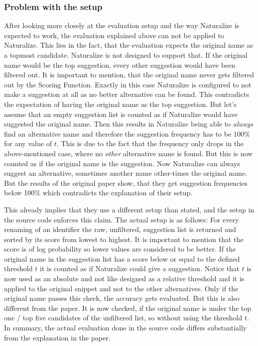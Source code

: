 \subsubsection{Problem with the setup}
After looking more closely at the evaluation setup and the way Naturalize is expected to work, the evaluation explained above can not be applied to Naturalize.
This lies in the fact, that the evaluation expects the original name as a topmost candidate. Naturalize is not designed to support that. If the original name would be the top suggestion, every other suggestion would have been filtered out. It is important to mention, that the original name never gets filtered out by the Scoring Function. Exactly in this case Naturalize is configured to not make a suggestion at all as no better alternative can be found. This contradicts the expectation of having the original name as the top suggestion. But let's assume that an empty suggestion list is counted as if Naturalize would have suggested the original name. Then this results in Naturalize being able to \emph{always} find an alternative name and therefore the suggestion frequency has to be 100\% for any value of $t$. This is due to the fact that the frequency only drops in the above-mentioned case, where no \emph{other} alternative name is found. But this is now counted as if the original name is the suggestion. Now Naturalize can always suggest an alternative, sometimes another name other-times the original name. But the results of the original paper show, that they get suggestion frequencies below 100\% which contradicts the explanation of their setup.

This already implies that they use a different setup than stated, and the setup in the source code enforces this claim. The actual setup is as follows:
For every renaming of an identifier the raw, unfiltered, suggestion list is returned and sorted by its score from lowest to highest. It is important to mention that the score is of log probability so lower values are considered to be better. If the original name in the suggestion list has a score below or equal to the defined threshold $t$ it is counted as if Naturalize could give a suggestion. Notice that $t$ is now used as an absolute and not like designed as a relative threshold and it is applied to the original snippet and not to the other alternatives. Only if the original name passes this check, the accuracy gets evaluated. But this is also different from the paper. It is now checked, if the original name is under the top one / top five candidates of the unfiltered list, so without using the threshold $t$. In summary, the actual evaluation done in the source code differs substantially from the explanation in the paper. 

